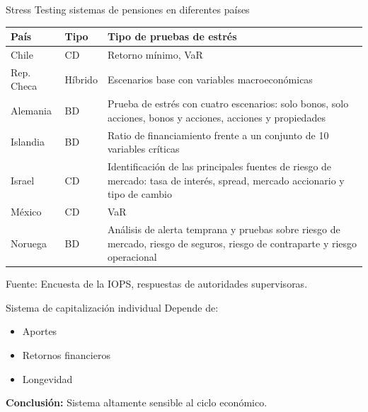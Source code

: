 \documentclass{beamer}
\begin{document}
\begin{frame}{Stress Testing  sistemas de pensiones en diferentes pa\'ises}
\footnotesize
\begin{table}[H]
\centering

\begin{tabular}{|l|l|p{6cm}|}
\hline
\textbf{País} & \textbf{Tipo} & \textbf{Tipo de pruebas de estrés} \\
\hline
Chile & CD & Retorno mínimo, VaR \\
\hline
Rep. Checa & Híbrido & Escenarios base con variables macroeconómicas \\
\hline
Alemania & BD & Prueba de estrés con cuatro escenarios: solo bonos, solo acciones, bonos y acciones, acciones y propiedades \\
\hline
Islandia & BD & Ratio de financiamiento frente a un conjunto de 10 variables críticas \\
\hline
Israel & CD & Identificación de las principales fuentes de riesgo de mercado: tasa de interés, spread, mercado accionario y tipo de cambio \\
\hline
México & CD & VaR \\
\hline
Noruega & BD & Análisis de alerta temprana y pruebas sobre riesgo de mercado, riesgo de seguros, riesgo de contraparte y riesgo operacional \\
\hline
\end{tabular}

\vspace{0.3cm}
\footnotesize{Fuente: Encuesta de la IOPS, respuestas de autoridades supervisoras.}
\end{table}
    
\end{frame}
\begin{frame}{Sistema de capitalización individual}
Depende de:
\begin{itemize}
\item Aportes
\item Retornos financieros
\item Longevidad
\end{itemize}

\vspace{0.5cm}

\textbf{Conclusión:} Sistema altamente sensible al ciclo económico.
\end{frame}
\end{document}
